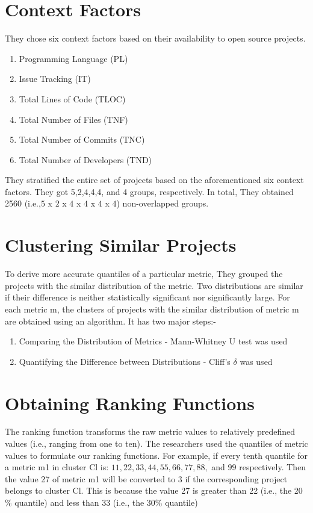 \section{Context Factors}
They chose six context factors based on their availability to open source projects.
\begin{enumerate}
\bf\item Programming Language (PL)
\bf\item Issue Tracking (IT) 
\bf\item Total Lines of Code (TLOC)
\bf\item Total Number of Files (TNF)
\bf\item Total Number of Commits (TNC)
\bf\item Total Number of Developers (TND)
\end{enumerate}
They stratified the entire set of projects based on the aforementioned six context factors. They got 5,2,4,4,4, and 4 groups, respectively. In total, They obtained 2560 (i.e.,$ 5 $ x $2 $ x $4$ x $4$ x $4$ x $4$) non-overlapped groups.


\section{Clustering Similar Projects}
To derive more accurate quantiles of a particular metric, They grouped the projects with the similar distribution of the metric. Two distributions are similar if their difference is neither statistically significant nor significantly large. For each metric m, the clusters of projects with the similar distribution of metric m are obtained using an algorithm. It has two major steps:-

\begin{enumerate}
\item Comparing the Distribution of Metrics - Mann-Whitney U test was used
\item Quantifying the Difference between Distributions - Cliff's $\delta$ was used
\end{enumerate}

\section{Obtaining Ranking Functions}



The ranking function transforms the raw metric values to relatively predefined values (i.e., ranging from one to ten). The researchers  used the quantiles of metric values to formulate our ranking functions. For example, if every tenth quantile for a metric m1 in cluster Cl is: $11, 22, 33, 44, 55, 66, 77, 88,$
and $99$ respectively. Then the value 27 of metric m1 will be converted to 3 if the corresponding project belongs to cluster Cl. This is because the value 27 is greater than 22 (i.e., the 20$\%$ quantile) and less than 33 (i.e., the 30$\%$ quantile)

